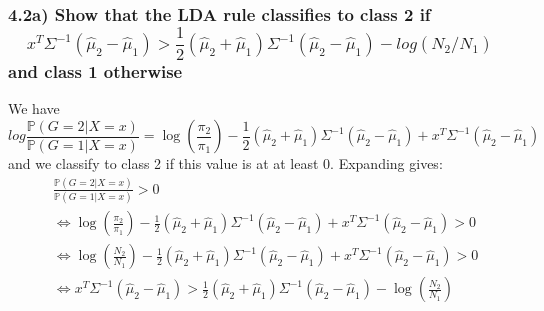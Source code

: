 \subsubsection*{4.2a) Show that the LDA rule classifies to class 2 if 
$$ x^T \Sigma^{-1} (\hat{\mu}_2 - \hat{\mu}_1) > \frac{1}{2} (\hat{\mu}_2 + \hat{\mu}_1) \Sigma^{-1} (\hat{\mu}_2 - \hat{\mu}_1) - log(N_2 / N_1)$$
and class 1 otherwise
}
We have
$$log \frac{\mathbb{P}(G = 2 \vert X = x)}{\mathbb{P}(G = 1 \vert X = x)} = \log\left(\frac{\pi_2}{\pi_1}\right) - \frac{1}{2}(\hat{\mu}_2 + \hat{\mu}_1) \Sigma^{-1} (\hat{\mu}_2 - \hat{\mu}_1)  + x^T \Sigma^{-1} (\hat{\mu}_2 - \hat{\mu}_1)$$
and we classify to class 2 if this value is at at least $0$.
Expanding gives:
\begin{align*}
    &\frac{\mathbb{P}(G = 2 \vert X = x)}{\mathbb{P}(G = 1 \vert X = x)} > 0 \\
    &\iff \log\left(\frac{\pi_2}{\pi_1}\right) - \frac{1}{2}(\hat{\mu}_2 + \hat{\mu}_1) \Sigma^{-1} (\hat{\mu}_2 - \hat{\mu}_1)  + x^T \Sigma^{-1} (\hat{\mu}_2 - \hat{\mu}_1) > 0 \\
    &\iff \log\left(\frac{N_2}{N_1}\right) - \frac{1}{2}(\hat{\mu}_2 + \hat{\mu}_1) \Sigma^{-1} (\hat{\mu}_2 - \hat{\mu}_1)  + x^T \Sigma^{-1} (\hat{\mu}_2 - \hat{\mu}_1) > 0 \\
    &\iff x^T \Sigma^{-1} (\hat{\mu}_2 - \hat{\mu}_1) > \frac{1}{2}(\hat{\mu}_2 + \hat{\mu}_1) \Sigma^{-1} (\hat{\mu}_2 - \hat{\mu}_1) -\log\left(\frac{N_2}{N_1}\right)
\end{align*}

